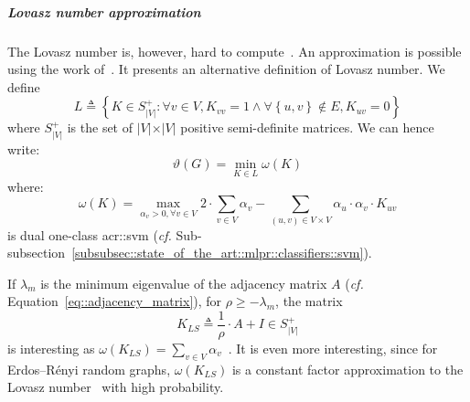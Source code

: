                 \subparagraph{Lovasz number approximation}
                    The Lovasz number is, however, hard to compute~\parencite{johansson2014global}.
                    An approximation is possible using the work of~\textcite{jethava2013lovasz}.
                    It presents an alternative definition of Lovasz number.
                    We define $$L \triangleq \left\{K \in S_{\vert V \vert}^+: \forall v \in V, K_{vv} = 1 \wedge \forall \left\{u, v\right\}  \notin E, K_{uv} = 0\right\}$$ where $S_{\vert V \vert}^+$ is the set of $\vert V \vert \times \vert V \vert$ positive semi-definite matrices.
                    We can hence write:
                    \begin{equation}
                        \label{eq::lovazs_number_alternative}
                        \vartheta(G) = \min_{K \in L} \omega(K)
                    \end{equation}
                    where:
                    \begin{equation}
                        \omega(K) = \max_{\alpha_v > 0, \forall v \in V} 2\cdot \sum_{v\in V} \alpha_v - \sum_{(u, v) \in V\times V} \alpha_u \cdot \alpha_v \cdot K_{uv}
                    \end{equation}
                    is dual one-class \gls{acr::svm} (\textit{cf.} Sub-subsection~\ref{subsubsec::state_of_the_art::mlpr::classifiers::svm}).

                    If $\lambda_m$ is the minimum eigenvalue of the adjacency matrix $A$ (\textit{cf.} Equation~\ref{eq::adjacency_matrix}), for $\rho\geq-\lambda_m$, the matrix
                    \begin{equation}
                        \label{eq::ls_matrix}
                        K_{LS} \triangleq \frac{1}{\rho} \cdot A + I \in S_{\vert V \vert}^+
                    \end{equation}
                    is interesting as $\omega(K_{LS}) = \sum_{v\in V} \alpha_v$~\parencite{jethava2013lovasz}.
                    It is even more interesting, since for Erdos–R\'enyi random graphs, $\omega(K_{LS})$ is a constant factor approximation to the Lovasz number~\parencite{jethava2013lovasz} with high probability.

